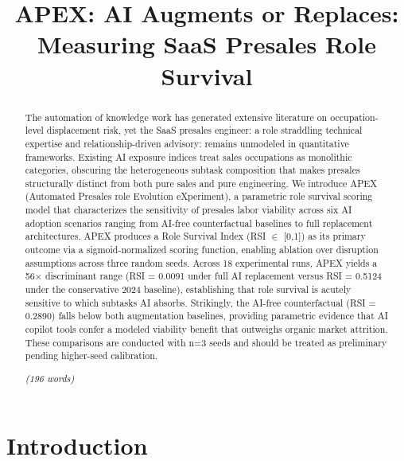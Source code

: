 \documentclass[10pt, conference]{IEEEtran}
\title{APEX: AI Augments or Replaces: Measuring SaaS Presales Role Survival}
\author{\IEEEauthorblockN{Akash Anipakalu Giridhar}}
\begin{document}
\begin{abstract}
The automation of knowledge work has generated extensive literature on occupation-level displacement risk, yet the SaaS presales engineer: a role straddling technical expertise and relationship-driven advisory: remains unmodeled in quantitative frameworks. Existing AI exposure indices \cite{chang2024survey} treat sales occupations as monolithic categories, obscuring the heterogeneous subtask composition that makes presales structurally distinct from both pure sales and pure engineering. We introduce APEX (Automated Presales role Evolution eXperiment), a parametric role survival scoring model that characterizes the sensitivity of presales labor viability across six AI adoption scenarios ranging from AI-free counterfactual baselines to full replacement architectures. APEX produces a Role Survival Index (RSI $\in$ [0,1]) as its primary outcome via a sigmoid-normalized scoring function, enabling ablation over disruption assumptions across three random seeds. Across 18 experimental runs, APEX yields a 56$\times$ discriminant range (RSI = 0.0091 under full AI replacement versus RSI = 0.5124 under the conservative 2024 baseline), establishing that role survival is acutely sensitive to which subtasks AI absorbs. Strikingly, the AI-free counterfactual (RSI = 0.2890) falls below both augmentation baselines, providing parametric evidence that AI copilot tools confer a modeled viability benefit that outweighs organic market attrition. These comparisons are conducted with n=3 seeds and should be treated as preliminary pending higher-seed calibration.

\textit{(196 words)}
\end{abstract}

\maketitle
\begin{abstract}

\end{abstract}

\section{Introduction}

\label{sec:introduction}
\end{document}

